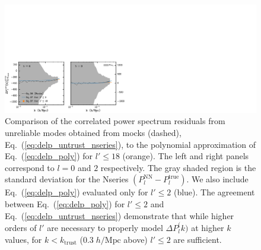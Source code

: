 \begin{figure}
\begin{center}
\includegraphics[width=1.\textwidth]{figs/fc/mock_catalog_tophatconv_delPlk_untrusted_18_rebin6x.pdf}
\caption{Comparison of the correlated power spectrum residuals from unreliable modes obtained from mocks (dashed), Eq.~(\ref{eq:delp_untrust_nseries}), 
to the polynomial approximation of  
Eq.~(\ref{eq:delp_poly}) for $l' \leq 18$ (orange). The left and right panels
correspond to $l = 0$ and $2$ respectively. The gray shaded region is the 
standard deviation for the Nseries $(P_l^\mathrm{NN} - P_l^\mathrm{true})$.  
We also include Eq.~(\ref{eq:delp_poly}) evaluated only for $l' \leq 2$ (blue). 
The agreement between Eq.~(\ref{eq:delp_poly}) for $l' \leq 2$ and Eq.~(\ref{eq:delp_untrust_nseries}) demonstrate that while higher orders of $l'$ are 
necessary to properly model $\Delta P_l^\mathrm(k)$ at higher $k$ values, 
for $k < k_\mathrm{trust}$ ($0.3\;h/\mathrm{Mpc}$ above) $l' \leq 2 $ are 
sufficient.}
\label{fig:delP_untrust}
\end{center}
\end{figure}


